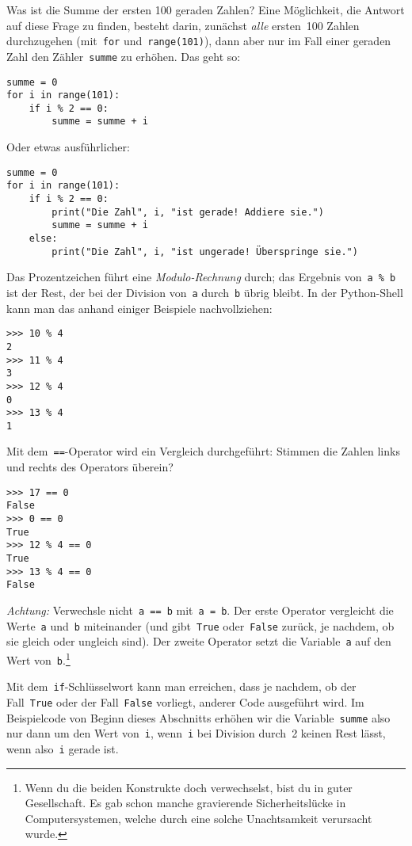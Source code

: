\documentclass{blatt}
\begin{document}
Was ist die Summe der ersten 100 geraden Zahlen? Eine Möglichkeit, die Antwort
auf diese Frage zu finden, besteht darin, zunächst \emph{alle} ersten~100
Zahlen durchzugehen (mit~\texttt{for}
und~\texttt{range(101)}), dann aber nur im Fall einer geraden Zahl
den Zähler~\texttt{summe} zu erhöhen. Das geht so:
\begin{verbatim}
summe = 0
for i in range(101):
    if i % 2 == 0:
        summe = summe + i
\end{verbatim}
Oder etwas ausführlicher:
\begin{verbatim}
summe = 0
for i in range(101):
    if i % 2 == 0:
        print("Die Zahl", i, "ist gerade! Addiere sie.")
        summe = summe + i
    else:
        print("Die Zahl", i, "ist ungerade! Überspringe sie.")
\end{verbatim}
Das Prozentzeichen führt eine \emph{Modulo-Rechnung} durch; das Ergebnis
von~\texttt{a \% b} ist der Rest, der bei der Division
von~\texttt{a} durch~\texttt{b} übrig bleibt. In der
Python-Shell kann man das anhand einiger Beispiele nachvollziehen:
\begin{verbatim}
>>> 10 % 4
2
>>> 11 % 4
3
>>> 12 % 4
0
>>> 13 % 4
1
\end{verbatim}
Mit dem~\texttt{==}-Operator wird ein Vergleich durchgeführt:
Stimmen die Zahlen links und rechts des Operators überein?
\begin{verbatim}
>>> 17 == 0
False
>>> 0 == 0
True
>>> 12 % 4 == 0
True
>>> 13 % 4 == 0
False
\end{verbatim}
\emph{Achtung:} Verwechsle nicht~\texttt{a == b}
mit~\texttt{a = b}. Der erste Operator vergleicht die
Werte~\texttt{a} und~\texttt{b} miteinander (und
gibt~\texttt{True} oder~\texttt{False} zurück, je
nachdem, ob sie gleich oder ungleich sind). Der zweite Operator setzt die
Variable~\texttt{a} auf den Wert
von~\texttt{b}.\footnote{Wenn du die beiden Konstrukte doch
verwechselst, bist du in guter Gesellschaft. Es gab schon manche gravierende
Sicherheitslücke in Computersystemen, welche durch eine solche Unachtsamkeit
verursacht wurde.}

Mit dem~\texttt{if}-Schlüsselwort kann man erreichen, dass je
nachdem, ob der Fall~\texttt{True} oder der
Fall~\texttt{False} vorliegt, anderer Code ausgeführt wird.
Im Beispielcode von Beginn dieses Abschnitts erhöhen wir die
Variable~\texttt{summe} also nur dann um den Wert
von~\texttt{i}, wenn~\texttt{i} bei Division durch~2
keinen Rest lässt, wenn also~\texttt{i} gerade ist.
\end{document}
